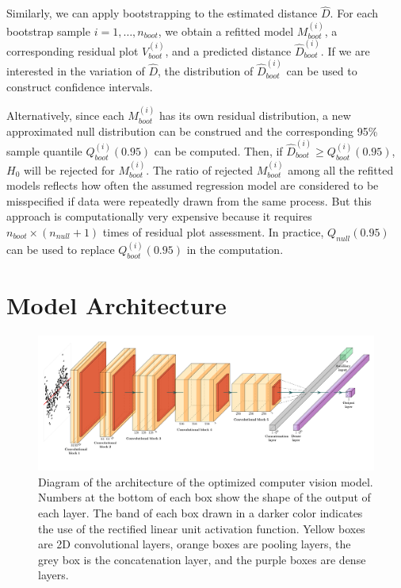 \documentclass[]{interact}
\theoremstyle{plain}%
\theoremstyle{definition}
\theoremstyle{remark}
\begin{document}
Similarly, we can apply bootstrapping to the estimated distance
\(\hat{D}\). For each bootstrap sample \(i = 1, \dots, n_{boot}\), we
obtain a refitted model \(M^{(i)}_{boot}\), a corresponding residual
plot \(V^{(i)}_{boot}\), and a predicted distance
\(\hat{D}^{(i)}_{boot}\). If we are interested in the variation of
\(\hat{D}\), the distribution of \(\hat{D}^{(i)}_{boot}\) can be used to
construct confidence intervals.

Alternatively, since each \(M_{boot}^{(i)}\) has its own residual
distribution, a new approximated null distribution can be construed and
the corresponding 95\% sample quantile \(Q_{boot}^{(i)}(0.95)\) can be
computed. Then, if \(\hat{D}_{boot}^{(i)} \geq Q_{boot}^{(i)}(0.95)\),
\(H_0\) will be rejected for \(M_{boot}^{(i)}\). The ratio of rejected
\(M_{boot}^{(i)}\) among all the refitted models reflects how often the
assumed regression model are considered to be misspecified if data were
repeatedly drawn from the same process. But this approach is
computationally very expensive because it requires
\(n_{boot} \times (n_{null} + 1)\) times of residual plot assessment. In
practice, \(Q_{null}(0.95)\) can be used to replace
\(Q_{boot}^{(i)}(0.95)\) in the computation.

\section{Model Architecture}\label{sec-model-architecture}

\begin{figure}

{\centering \includegraphics[width=1\linewidth]{paper_files/figure-latex/cnn-diag-1} 

}

\caption{Diagram of the architecture of the optimized computer vision model. Numbers at the bottom of each box show the shape of the output of each layer. The band of each box drawn in a darker color indicates the use of the rectified linear unit activation function.  Yellow boxes are 2D convolutional layers, orange boxes are pooling layers, the grey box is the concatenation layer, and the purple boxes are dense layers.}\label{fig:cnn-diag}
\end{figure}
\end{document}
